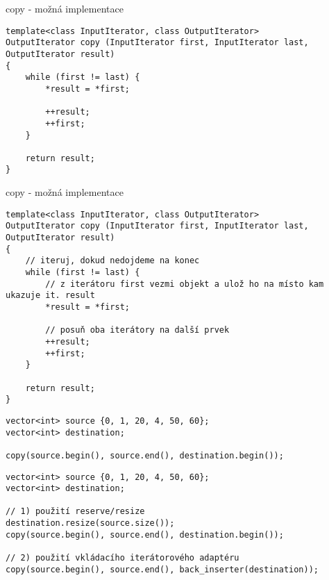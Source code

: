 \begin{frame}[fragile]
\begin{block}{copy - možná implementace}
\begin{lstlisting}
template<class InputIterator, class OutputIterator>
OutputIterator copy (InputIterator first, InputIterator last, OutputIterator result)
{
	while (first != last) {
		*result = *first;
		
		++result; 
		++first;
	}
	
	return result;
}
\end{lstlisting}
\end{block}
\end{frame}

\begin{frame}[fragile]
\begin{block}{copy - možná implementace}
\begin{lstlisting}
template<class InputIterator, class OutputIterator>
OutputIterator copy (InputIterator first, InputIterator last, OutputIterator result)
{
	// iteruj, dokud nedojdeme na konec
	while (first != last) {
		// z iterátoru first vezmi objekt a ulož ho na místo kam ukazuje it. result
		*result = *first;
		
		// posuň oba iterátory na další prvek
		++result; 
		++first;
	}
	
	return result;
}
\end{lstlisting}
\end{block}
\end{frame}

\begin{frame}[fragile]
\begin{noblock}
\begin{lstlisting}
vector<int> source {0, 1, 20, 4, 50, 60};
vector<int> destination;

copy(source.begin(), source.end(), destination.begin());
\end{lstlisting}
\end{noblock}

\begin{yesblock}
\begin{lstlisting}
vector<int> source {0, 1, 20, 4, 50, 60};
vector<int> destination;

// 1) použití reserve/resize
destination.resize(source.size());
copy(source.begin(), source.end(), destination.begin());

// 2) použití vkládacího iterátorového adaptéru
copy(source.begin(), source.end(), back_inserter(destination));
\end{lstlisting}
\end{yesblock}
\end{frame}





